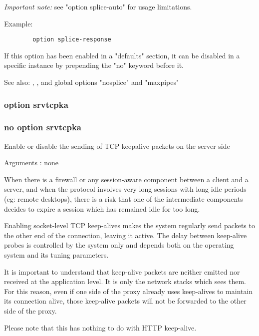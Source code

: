   \emph{Important note:} see "option splice-auto" for usage limitations.

  Example:
  \begin{verbatim}
        option splice-response
  \end{verbatim}

  If this option has been enabled in a "defaults" section, it can be disabled
  in a specific instance by prepending the "no" keyword before it.

  See also: , , and global options
             "nosplice" and "maxpipes"

\subsubsection[option srvtcpka]{option srvtcpka}
\subsubsection[no option srvtcpka]{no option srvtcpka}


  Enable or disable the sending of TCP keepalive packets on the server side


  Arguments : none

  When there is a firewall or any session-aware component between a client and
  a server, and when the protocol involves very long sessions with long idle
  periods (eg: remote desktops), there is a risk that one of the intermediate
  components decides to expire a session which has remained idle for too long.

  Enabling socket-level TCP keep-alives makes the system regularly send packets
  to the other end of the connection, leaving it active. The delay between
  keep-alive probes is controlled by the system only and depends both on the
  operating system and its tuning parameters.

  It is important to understand that keep-alive packets are neither emitted nor
  received at the application level. It is only the network stacks which sees
  them. For this reason, even if one side of the proxy already uses keep-alives
  to maintain its connection alive, those keep-alive packets will not be
  forwarded to the other side of the proxy.

  Please note that this has nothing to do with HTTP keep-alive.

